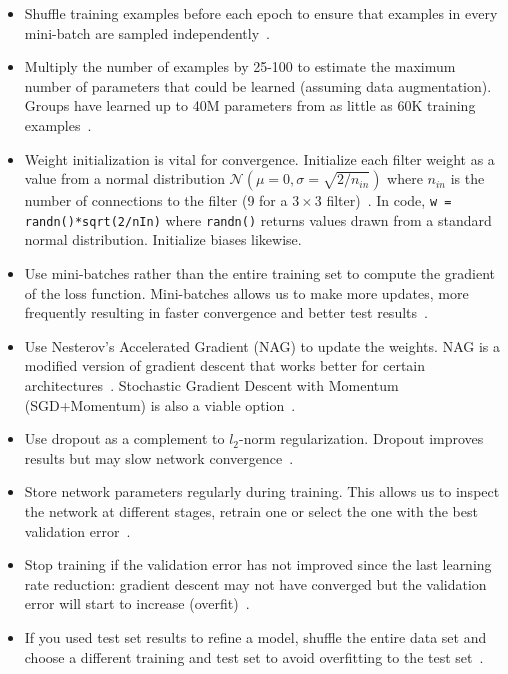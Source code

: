 \begin{itemize}
	\item Shuffle training examples before each epoch to ensure that examples in every mini-batch are sampled independently~\cite{Bengio2012}.

	\item Multiply the number of examples by 25-100 to estimate the maximum number of parameters that could be learned (assuming data augmentation). Groups have learned up to 40M parameters from as little as 60K training examples~\cite{Dieleman2015, Springenberg2014}.

	\item Weight initialization is vital for convergence. Initialize each filter weight as a value from a normal distribution $\mathcal{N}(\mu = 0, \sigma = \sqrt{2/n_{in}})$ where $n_{in}$ is the number of connections to the filter (9 for a $3\times 3$ filter)~\cite{He2015}. In code, \texttt{w = randn()*sqrt(2/nIn)} where \texttt{randn()} returns values drawn from a standard normal distribution. Initialize biases likewise.

	\item Use mini-batches rather than the entire training set to compute the gradient of the loss function. Mini-batches allows us to make more updates, more frequently resulting in faster convergence and better test results~\cite{Bengio2012}.

	\item Use Nesterov's Accelerated Gradient (NAG) to update the weights. NAG is a modified version of gradient descent that works better for certain architectures~\cite{Bengio2012b}. Stochastic Gradient Descent with Momentum (SGD+Momentum) is also a viable option~\cite{Karpathy2015}.

	\item Use dropout as a complement to $l_2$-norm regularization. Dropout improves results but may slow network convergence~\cite{Krizhevsky2012}.

	\item Store network parameters regularly during training. This allows us to inspect the network at different stages, retrain one or select the one with the best validation error~\cite{Bengio2014}.

	\item Stop training if the validation error has not improved since the last learning rate reduction: gradient descent may not have converged but the validation error will start to increase (overfit)~\cite{Bengio2012}.

	\item If you used test set results to refine a model, shuffle the entire data set and choose a different training and test set to avoid overfitting to the test set~\cite{Ng2014}.
\end{itemize}


